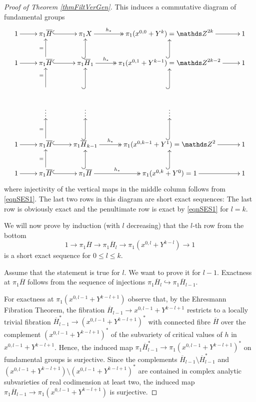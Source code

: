 \begin{proof}[Proof of Theorem \ref{thmFiltVerGen}]
This induces a commutative diagram of fundamental groups 
\begin{equation}
\xymatrix{
1\ar[r] & \pi_1 \overline{H} \ar@{^{(}->}[r] & \pi_1 X \ar@{->>}[r] ^-{h_{\ast}} & \pi_1(x^{0,0}+Y^{k})= \ZZ^{2k}\ar[r] &1\\
1\ar[r] & \pi_1 \overline{H} \ar@{^{(}->}[r] \ar[u]^{=} & \pi_1 \overline{H}_1 \ar@{->>}[r]^-{h_{\ast}} \ar@{^{(}->}[u] & \pi_1(x^{0,1}+Y^{k-1})=\ZZ ^{2k-2} \ar@{^{(}->}[u]\ar[r] &1 \\
 & \ar[u]^{=} &  \ar@{^{(}->}[u] & \ar@{^{(}->}[u] & \\
 & \vdots & \vdots &\vdots & \\
1\ar[r] & \pi_1 \overline{H} \ar@{^{(}->}[r] \ar[u]^{=} & \pi_1 \overline{H}_{k-1} \ar@{->>}[r]^-{h_{\ast}} \ar@{^{(}->}[u] & \pi_1(x^{0,k-1}+Y^1)=\ZZ ^2 \ar@{^{(}->}[u]\ar[r] &1 \\
1\ar[r] & \pi_1 \overline{H} \ar@{^{(}->}[r] \ar[u]^{=} & \pi_1 \overline{H} \ar@{->>}[r]^-{h_{\ast}} \ar@{^{(}->}[u] & \pi_1(x^{0,k}+Y^0)=1 \ar@{^{(}->}[u]\ar[r] &1 \\
}
\label{eqndiaggps}
\end{equation}
where injectivity of the vertical maps in the middle column follows from \eqref{eqnSES1}. The last two rows in this diagram are short exact sequences: The last row is obviously exact and the penultimate row is exact by \eqref{eqnSES1} for $l=k$.

We will now prove by induction (with $l$ decreasing) that the $l$-th row from the bottom
\[
1\rightarrow \pi_1 \overline{H} \rightarrow \pi_1 \overline{H}_l\rightarrow \pi_1(x^{0,l}+Y^{k-l})\rightarrow 1
\]
is a short exact sequence for $0\leq l\leq k$. 

Assume that the statement is true for $l$. We want to prove it for $l-1$. Exactness at $\pi_1\overline{H}$ follows from the sequence of injections $\pi_1 \overline{H}_l \hookrightarrow \pi_1 \overline{H}_{l-1}$.

For exactness at $\pi_1 (x^{0,l-1}+Y^{k-l+1})$ observe that, by the Ehresmann Fibration Theorem, the fibration $\overline{H}_{l-1}\rightarrow x^{0,l-1}+Y^{k-l+1}$ restricts to a locally trivial fibration $\overline{H}_{l-1}^*\rightarrow (x^{0,l-1}+Y^{k-l+1})^*$  with connected fibre $\overline{H}$ over the complement $(x^{0,l-1}+Y^{k-l+1})^*$ of the subvariety of critical values of $h$ in $x^{0,l-1}+Y^{k-l+1}$. Hence, the induced map $\pi_1 \overline{H}_{l-1}^*\rightarrow \pi_1 (x^{0,l-1}+Y^{k-l+1})^*$ on fundamental groups is surjective. Since the complements $\overline{H}_{l-1}\setminus \overline{H}_{l-1}^*$ and $(x^{0,l-1}+Y^{k-l+1})\setminus (x^{0,l-1}+Y^{k-l+1})^*$ are contained in complex analytic subvarieties of real codimension at least two, the induced map $\pi_1 \overline{H}_{l-1}\rightarrow \pi_1 (x^{0,l-1}+Y^{k-l+1})$ is surjective.


\end{proof}
